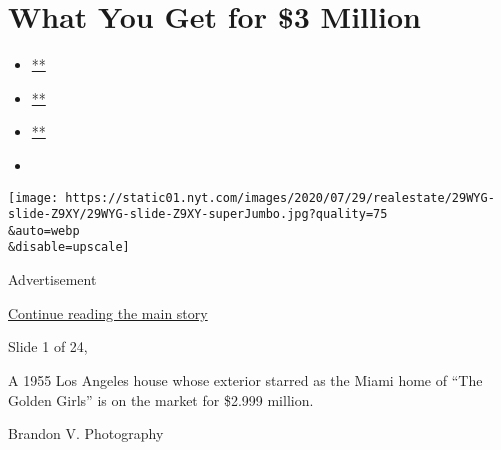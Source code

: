 \hypertarget{what-you-get-for-3-million}{%
\section{What You Get for \$3
Million}\label{what-you-get-for-3-million}}

\begin{itemize}
\item
  \href{https://www.facebook.com/sharer.php?app_id=9869919170\&u=https\%3A\%2F\%2Fwww.nytimes.com\%2Fslideshow\%2F2020\%2F07\%2F29\%2Frealestate\%2Fwhat-you-get-for-3-million.html\%3Fsmid\%3Dfb-share\&name=What\%20You\%20Get\%20for\%20\%243\%20Million\&redirect_uri=https\%3A\%2F\%2Fwww.facebook.com\%2F}{**}
\item
  \href{https://twitter.com/intent/tweet?url=https\%3A\%2F\%2Fwww.nytimes.com\%2Fslideshow\%2F2020\%2F07\%2F29\%2Frealestate\%2Fwhat-you-get-for-3-million.html\%3Fsmid\%3Dtw-share\&text=What\%20You\%20Get\%20for\%20\%243\%20Million}{**}
\item
  \href{mailto:?subject=NYTimes.com\%3A\%20What\%20You\%20Get\%20for\%20\%243\%20Million\&body=From\%20The\%20New\%20York\%20Times\%3A\%0A\%0AWhat\%20You\%20Get\%20for\%20\%243\%20Million\%0A\%0AA\%20midcentury-modern\%20house\%20in\%20Los\%20Angeles\%2C\%20a\%201910\%20home\%20outside\%20Chicago\%20and\%20a\%2028-acre\%20seasonal\%20camp\%20on\%20Mount\%20Desert\%20Island\%20in\%20Maine.\%0A\%0Ahttps\%3A\%2F\%2Fwww.nytimes.com\%2Fslideshow\%2F2020\%2F07\%2F29\%2Frealestate\%2Fwhat-you-get-for-3-million.html\%3Fsmid\%3Dem-share}{**}
\item
\end{itemize}

\texttt{[image: https://static01.nyt.com/images/2020/07/29/realestate/29WYG-slide-Z9XY/29WYG-slide-Z9XY-superJumbo.jpg?quality=75\\\&auto=webp\\\&disable=upscale]}

Advertisement

\protect\hyperlink{after-right-0}{Continue reading the main story}

Slide 1 of 24,

A 1955 Los Angeles house whose exterior starred as the Miami home of
``The Golden Girls'' is on the market for \$2.999 million.

Brandon V. Photography

